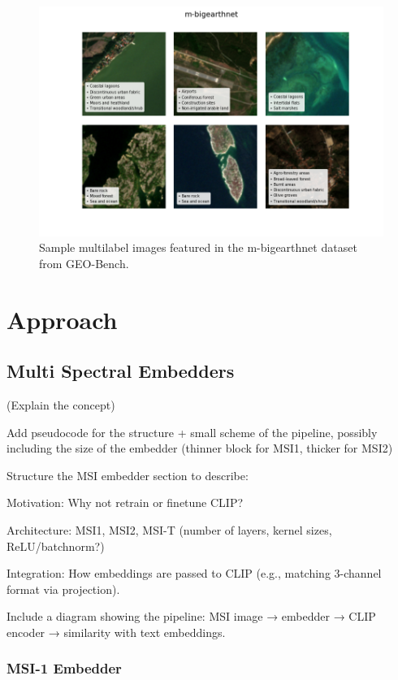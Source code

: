 \documentclass[a4paper, oneside, english]{sapthesis} %
\begin{document}
\begin{figure}[h]
    \centering
    \includegraphics[width=\textwidth]{img/m-bigearthnet_image_grid.png}
    \caption{Sample multilabel images featured in the m-bigearthnet dataset from GEO-Bench.}
    \label{fig:bengrid}
\end{figure}


\chapter{Approach} %

\section{Multi Spectral Embedders}

(Explain the concept)

Add pseudocode for the structure + small scheme of the pipeline, possibly including the size of the embedder (thinner block for MSI1, thicker for MSI2)

Structure the MSI embedder section to describe:

Motivation: Why not retrain or finetune CLIP?

Architecture: MSI1, MSI2, MSI-T (number of layers, kernel sizes, ReLU/batchnorm?)

Integration: How embeddings are passed to CLIP (e.g., matching 3-channel format via projection).

Include a diagram showing the pipeline: MSI image → embedder → CLIP encoder → similarity with text embeddings.


\subsection{MSI-1 Embedder}
\end{document}
